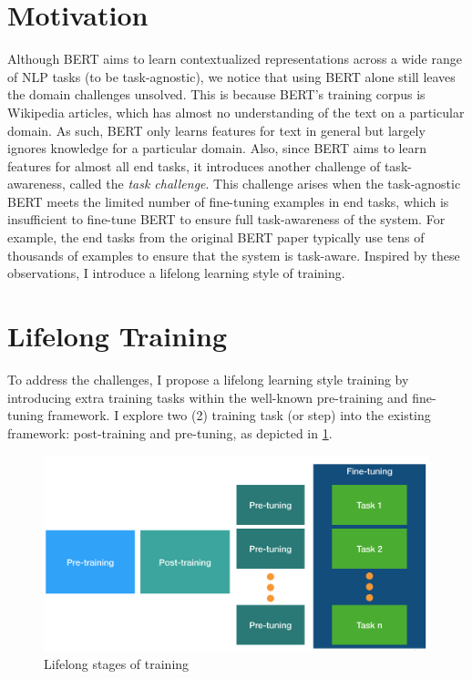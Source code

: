 \section{Motivation}
\label{chap4:sec:motivation}

Although BERT aims to learn contextualized representations across a wide range of NLP tasks (to be task-agnostic), we notice that using BERT alone still leaves the domain challenges unsolved.
This is because BERT's training corpus is Wikipedia articles, which has almost no understanding of the text on a particular domain.
As such, BERT only learns features for text in general but largely ignores knowledge for a particular domain.
Also, since BERT aims to learn features for almost all end tasks, it introduces another challenge of task-awareness, called the \textit{task challenge}.
This challenge arises when the task-agnostic BERT meets the limited number of fine-tuning examples in end tasks, which is insufficient to fine-tune BERT to ensure full task-awareness of the system.
For example, the end tasks from the original BERT paper typically use tens of thousands of examples to ensure that the system is task-aware.
Inspired by these observations, I introduce a lifelong learning style of training.

\section{Lifelong Training}

To address the challenges, I propose a lifelong learning style training by introducing extra training tasks within the well-known pre-training and fine-tuning framework.
I explore two (2) training task (or step) into the existing framework: post-training and pre-tuning, as depicted in \ref{chap4:fig:ll_train}.

\begin{figure}
\centering
\includegraphics[width=5.5in]{fig/ll_train.png}
    \caption{Lifelong stages of training}
\label{chap4:fig:ll_train}
\vspace{-3mm}
\end{figure}


